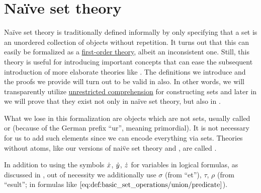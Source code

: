 \section{Na\"ive set theory}\label{sec:naive_set_theory}

Na\"ive set theory is traditionally defined informally by only specifying that a set is an unordered collection of objects without repetition. It turns out that this can easily be formalized as a \hyperref[def:first_order_theory]{first-order theory}, albeit an inconsistent one. Still, this theory is useful for introducing important concepts that can ease the subsequent introduction of more elaborate theories like \hyperref[def:zfc]{}. The definitions we introduce and the proofs we provide will turn out to be valid in  also. In other words, we will transparently utilize \hyperref[def:naive_set_theory/unrestricted_comprehension]{unrestricted comprehension} for constructing sets and later in  we will prove that they exist not only in na\"ive set theory, but also in .

\begin{remark}\label{rem:pure_set_theory}
  What we lose in this formalization are objects which are not sets, usually called  or  (because of the German prefix \enquote{ur}, meaning primordial). It is not necessary for us to add such elements since we can encode everything via sets. Theories without atoms, like our versions of nai\"ve set theory and \hyperref[def:axiom_of_universes]{}, are called .
\end{remark}

\begin{remark}\label{rem:set_theory_formula_variables}
  In addition to using the symbols \( {\dot{x}} \), \( {\dot{y}} \), \( {\dot{z}} \) for variables in logical formulas, as discussed in , out of necessity we additionally use \( \sigma \) (from \enquote{et}), \( \tau \), \( \rho \) (from \enquote{esult}; in formulas like \( \ref{eq:def:basic_set_operations/union/predicate} \)).
\end{remark}

